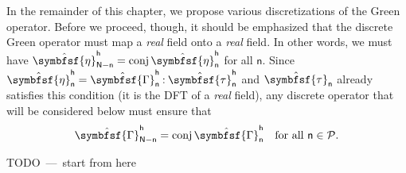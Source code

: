 \documentclass[draft, appendixprefix=true, chapterprefix=true, fontsize=12pt, numbers=noendperiod]{scrbook}
\newcommand{\cellindices}{\mathcal P}
\DeclareMathOperator{\conj}{conj}
\newcommand{\dbldot}{\mathbin{\mathord{:}}}
\newcommand{\tens}[1]{\symbfsf{#1}}
\newcommand{\todo}[1]{\color{red}TODO~---~#1\color{black}}
\newcommand{\tuple}[1]{\mathsf{#1}}
\begin{document}
\bigskip

In the remainder of this chapter, we propose various discretizations of the
Green operator. Before we proceed, though, it should be emphasized that the
discrete Green operator must map a \emph{real} field onto a \emph{real}
field. In other words, we must have
\(\hat{\tens\eta}_{\tuple N-\tuple n}^{\tuple h}=\conj\hat{\tens\eta}_{\tuple
  n}^{\tuple h}\) for all \(\tuple n\). Since
\(\hat{\tens\eta}_{\tuple n}^{\tuple h} =\hat{\tens\Gamma}_{\tuple n}^{\tuple
  h}\dbldot \hat{\tens\tau}_{\tuple n}^{\tuple h}\) and
\(\hat{\tens\tau}_{\tuple n}\) already satisfies this condition (it is the DFT
of a \emph{real} field), any discrete operator that will be considered below
must ensure that
\begin{equation}
  \hat{\tens\Gamma}_{\tuple N-\tuple n}^{\tuple h}=\conj\hat{\tens\Gamma}_{\tuple
    n}^{\tuple h}\quad\text{for all }\tuple n\in\cellindices.
\end{equation}

\todo{start from here}
\end{document}

